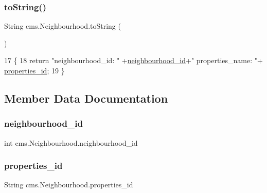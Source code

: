 \subsubsection{\texorpdfstring{to\+String()}{toString()}}
{\footnotesize\ttfamily String cms.\+Neighbourhood.\+to\+String (\begin{DoxyParamCaption}{ }\end{DoxyParamCaption})\hspace{0.3cm}{\ttfamily [inline]}}


\begin{DoxyCode}
17                             \{
18         \textcolor{keywordflow}{return}  \textcolor{stringliteral}{"neighbourhood\_id: "} +\mbox{\hyperlink{classcms_1_1_neighbourhood_a8c177196de739fc0f3f68c3865c6fabf}{neighbourhood\_id}}+\textcolor{stringliteral}{" properties\_name: "}+
      \mbox{\hyperlink{classcms_1_1_neighbourhood_a0264ef7dc2043131f27221feca29d254}{properties\_id}};
19     \}
\end{DoxyCode}


\subsection{Member Data Documentation}
\mbox{\label{classcms_1_1_neighbourhood_a8c177196de739fc0f3f68c3865c6fabf}} 
\subsubsection{\texorpdfstring{neighbourhood\+\_\+id}{neighbourhood\_id}}
{\footnotesize\ttfamily int cms.\+Neighbourhood.\+neighbourhood\+\_\+id\hspace{0.3cm}{\ttfamily [package]}}

\mbox{\label{classcms_1_1_neighbourhood_a0264ef7dc2043131f27221feca29d254}} 
\subsubsection{\texorpdfstring{properties\+\_\+id}{properties\_id}}
{\footnotesize\ttfamily String cms.\+Neighbourhood.\+properties\+\_\+id\hspace{0.3cm}{\ttfamily [package]}}

